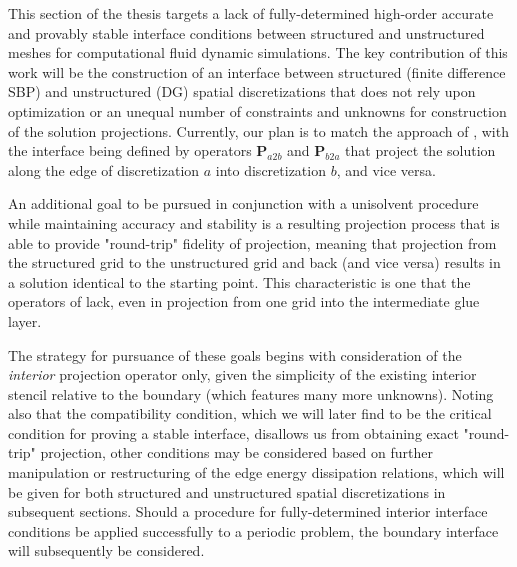 
This section of the thesis targets a lack of fully-determined high-order
accurate and provably stable interface conditions between structured and unstructured
meshes for computational fluid dynamic simulations. The key contribution of this work
will be the construction of an interface between structured (finite difference SBP)
and unstructured (DG) spatial discretizations that does not rely upon
optimization or an unequal number of constraints and unknowns for construction
of the solution projections. Currently, our plan is to match the approach of
\cite{kozdon2016stable}, with the interface being defined by operators $\pmb{P}_{a2b}$
and $\pmb{P}_{b2a}$ that project the solution along the edge of discretization $a$
into discretization $b$, and vice versa.

An additional goal to be pursued in conjunction with a unisolvent procedure while
maintaining accuracy and stability is a resulting projection process that is able to
provide "round-trip" fidelity of projection, meaning that projection from the structured
grid to the unstructured grid and back (and vice versa) results in a solution identical to the starting
point. This characteristic is one that the operators of \cite{kozdon2016stable} lack,
even in projection from one grid into the intermediate glue layer.

The strategy for pursuance of these goals begins with consideration of the
\emph{interior} projection operator only, given the simplicity of the existing
interior stencil relative to the boundary (which features many more unknowns).
Noting also that the compatibility condition, which we will later find to be the
critical condition for proving a stable interface, disallows us from obtaining
exact "round-trip" projection, other conditions may be considered based
on further manipulation or restructuring of the edge energy dissipation relations,
which will be given for both structured and unstructured spatial discretizations
in subsequent sections. Should a procedure for fully-determined interior interface
conditions be applied successfully to a periodic problem, the boundary interface
will subsequently be considered.


